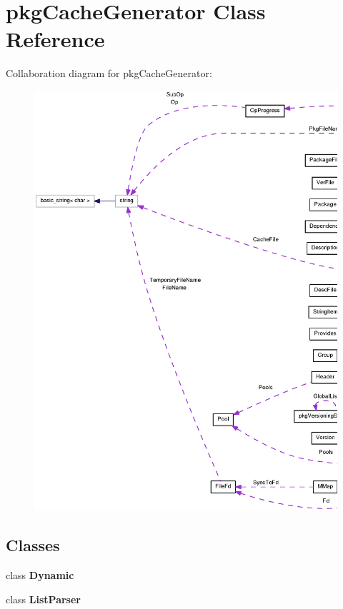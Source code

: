\section{pkg\-Cache\-Generator \-Class \-Reference}
\label{classpkgCacheGenerator}


\-Collaboration diagram for pkg\-Cache\-Generator\-:
\nopagebreak
\begin{figure}[H]
\begin{center}
\leavevmode
\includegraphics[width=350pt]{classpkgCacheGenerator__coll__graph}
\end{center}
\end{figure}
\subsection*{\-Classes}
\begin{DoxyCompactItemize}
\item 
class {\bf \-Dynamic}
\item 
class {\bf \-List\-Parser}
\end{DoxyCompactItemize}
